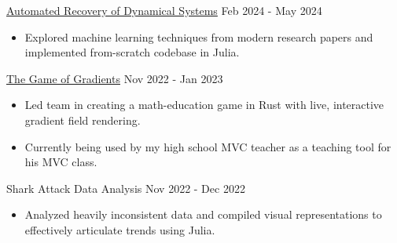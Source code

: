 \documentclass[9pt]{resume}
\begin{document}
    \vspace{-0.2cm}
    \begin{experiencelist}
        \experiencenocompany
            {\href{https://github.com/TheSharkhead2/nonlinear_dynamics_recovery}{Automated Recovery of Dynamical Systems}}
            {Feb 2024 - May 2024}
            {\begin{itemize}[noitemsep, topsep=1pt] 
                \item Explored machine learning techniques from modern research papers and implemented from-scratch codebase in Julia.
            \end{itemize}}
        \experiencenocompany
            {\href{https://github.com/TheSharkhead2/The_Game_of_Gradients}{The Game of Gradients}}
            {Nov 2022 - Jan 2023}
            {\begin{itemize}[noitemsep, topsep=1pt] 
                \item Led team in creating a math-education game in Rust with live, interactive gradient field rendering.
                \item Currently being used by my high school MVC teacher as a teaching tool for his MVC class. 
            \end{itemize}}
        \experiencenocompany 
            {Shark Attack Data Analysis}
            {Nov 2022 - Dec 2022}
            {\begin{itemize}[noitemsep, topsep=1pt]
                \item Analyzed heavily inconsistent data and compiled visual representations to effectively articulate trends using Julia. 

\end{itemize}}
\end{experiencelist}
\end{document}
